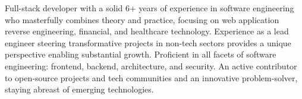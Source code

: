 

\begin{cvparagraph}

Full-stack developer with a solid 6+ years of experience in software engineering who masterfully combines theory and practice, focusing on web application reverse engineering, financial, and healthcare technology. Experience as a lead engineer steering transformative projects in non‑tech sectors provides a unique perspective enabling substantial growth. Proficient in all facets of software engineering: frontend, backend, architecture, and security. An active contributor to open‑source projects and tech communities and an innovative problem-solver, staying abreast of emerging technologies.
\end{cvparagraph}
